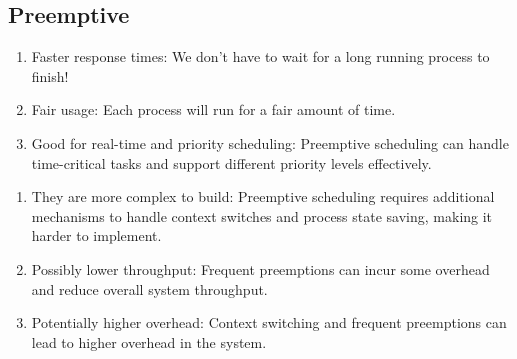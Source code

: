 \documentclass{report}
\begin{document}
\subsection*{Preemptive}
\begin{tcbraster}[raster columns=2, raster equal height, raster force size=false]
  \begin{tcolorbox}[colback=green!5!white,colframe=black!75!green,title=Advantages]
    \begin{enumerate}[label=\textit{(\roman*)}]
    \item Faster response times: We don't have to wait for a long running process to finish!
    \item Fair usage: Each process will run for a fair amount of time.
    \item Good for real-time and priority scheduling: Preemptive scheduling can handle time-critical
      tasks and support different priority levels effectively.
    \end{enumerate}
  \end{tcolorbox}
  \begin{tcolorbox}[colback=red!5!white,colframe=black!40!red,title=Disadvantages]
    \begin{enumerate}[label=\textit{(\roman*)}]
    \item They are more complex to build: Preemptive scheduling requires additional mechanisms to
      handle context switches and process state saving, making it harder to implement.
    \item Possibly lower throughput: Frequent preemptions can incur some overhead and reduce overall
      system throughput.
    \item Potentially higher overhead: Context switching and frequent preemptions can lead to higher
      overhead in the system. 
    \end{enumerate}
  \end{tcolorbox}
\end{tcbraster}
\end{document}
